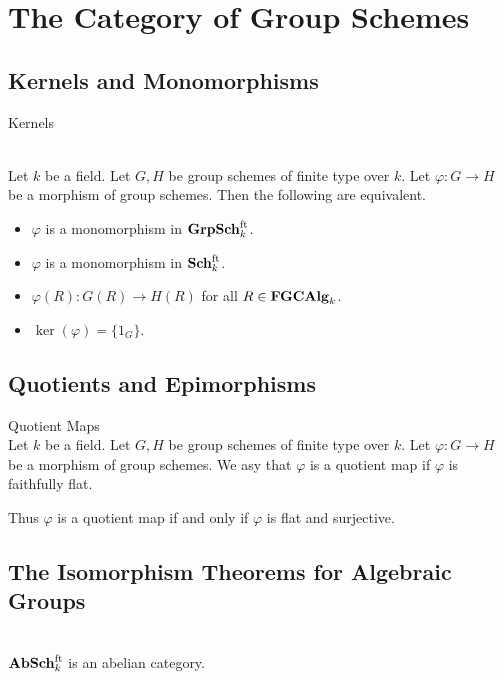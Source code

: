 \documentclass[a4paper]{article}
\begin{document}
\pagebreak
\section{The Category of Group Schemes}
\subsection{Kernels and Monomorphisms}
\begin{defn}{Kernels}{}\\
\end{defn}

\begin{prp}{}{}\\
Let $k$ be a field. Let $G,H$ be group schemes of finite type over $k$. Let $\varphi:G\to H$ be a morphism of group schemes. Then the following are equivalent. 
\begin{itemize}
\item $\varphi$ is a monomorphism in $\bold{GrpSch}_k^\text{ft}$. 
\item $\varphi$ is a monomorphism in $\bold{Sch}_k^\text{ft}$. 
\item $\varphi(R):G(R)\to H(R)$ for all $R\in\bold{FGCAlg}_k$. 
\item $\ker(\varphi)=\{1_G\}$. 
\end{itemize}
\end{prp}

\subsection{Quotients and Epimorphisms}
\begin{defn}{Quotient Maps}{}\\
Let $k$ be a field. Let $G,H$ be group schemes of finite type over $k$. Let $\varphi:G\to H$ be a morphism of group schemes. We asy that $\varphi$ is a quotient map if $\varphi$ is faithfully flat. 
\end{defn}

Thus $\varphi$ is a quotient map if and only if $\varphi$ is flat and surjective. 

\subsection{The Isomorphism Theorems for Algebraic Groups}
\begin{prp}{}{}\\
$\bold{AbSch}_k^\text{ft}$ is an abelian category. 
\end{prp}
\end{document}
